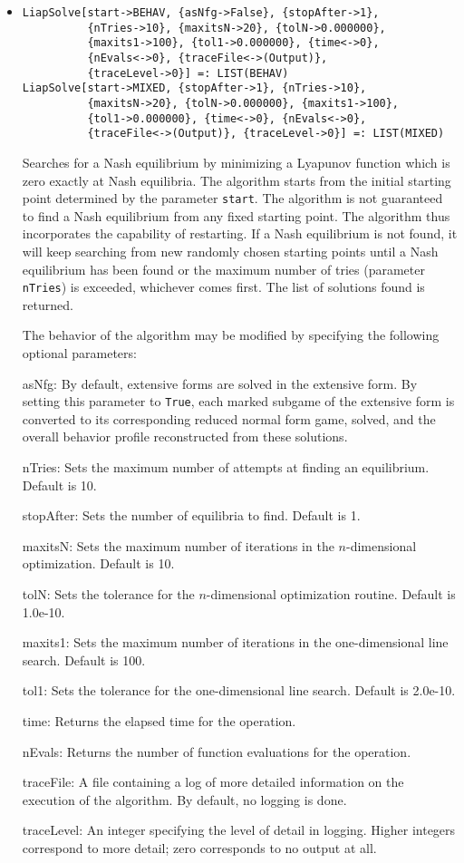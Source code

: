 \begin{itemize}
\item{}
\protect \large \begin{verbatim}
LiapSolve[start->BEHAV, {asNfg->False}, {stopAfter->1}, 
          {nTries->10}, {maxitsN->20}, {tolN->0.000000}, 
          {maxits1->100}, {tol1->0.000000}, {time<->0}, 
          {nEvals<->0}, {traceFile<->(Output)}, 
          {traceLevel->0}] =: LIST(BEHAV) 
LiapSolve[start->MIXED, {stopAfter->1}, {nTries->10}, 
          {maxitsN->20}, {tolN->0.000000}, {maxits1->100}, 
          {tol1->0.000000}, {time<->0}, {nEvals<->0}, 
          {traceFile<->(Output)}, {traceLevel->0}] =: LIST(MIXED) 
\end{verbatim}\normalsize


\bd 
Searches for a Nash equilibrium by minimizing a Lyapunov function
which is zero exactly at Nash equilibria.  The algorithm starts from
the initial starting point determined by the parameter \verb+start+.
The algorithm is not guaranteed to find a Nash equilibrium from any
fixed starting point.  The algorithm thus incorporates the capability
of restarting.  If a Nash equilibrium is not found, it will keep
searching from new randomly chosen starting points until a Nash
equilibrium has been found or the maximum number of tries (parameter
\verb+nTries+) is exceeded, whichever comes first.  The list of
solutions found is returned.

The behavior of the algorithm may be modified by specifying the following
optional parameters:
\bd
\item
[asNfg:] By default, extensive forms are solved in the extensive form.
By setting this parameter to \verb+True+, each marked subgame of the
extensive form is converted to its corresponding reduced normal form game,
solved, and the overall behavior profile reconstructed from these
solutions.
\item
[nTries:] Sets the maximum number of attempts at finding an
equilibrium. Default is 10.
\item
[stopAfter:] Sets the number of equilibria to find.  Default is 1.
\item
[maxitsN:] Sets the maximum number of iterations in the
$n$-dimensional optimization.  Default is 10.
\item
[tolN:] Sets the tolerance for the $n$-dimensional optimization
routine.  Default is 1.0e-10.
\item
[maxits1:] Sets the maximum number of iterations in the
one-dimensional line search.  Default is 100.
\item
[tol1:] Sets the tolerance for the one-dimensional line search.
Default is 2.0e-10.
\item
[time:] Returns the elapsed time for the operation.
\item
[nEvals:] Returns the number of function evaluations for the operation.
\item
[traceFile:] A file containing a log of more detailed information on the
execution of the algorithm.  By default, no logging is done.
\item
[traceLevel:] An integer specifying the level of detail in logging.
Higher integers correspond to more detail; zero corresponds to no output
at all.
\ed
\ed


\end{itemize}

